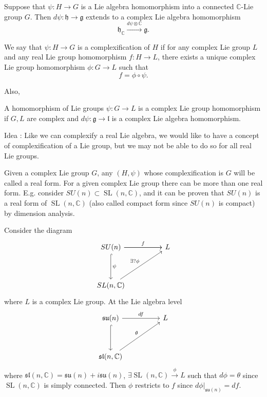 \documentclass[11pt,a4paper]{scrarticle}
\theoremstyle{definition}
\theoremstyle{greenbox}
\newcommand{\C}{\mathbb{C}}
\newcommand{\fg}{\mathfrak{g}}
\newcommand{\hg}{\mathfrak{h}}
\begin{document}
Suppose that $ \psi : H \to G $ is a Lie algebra homomorphism into a connected $ \C $-Lie group $ G $. Then $ d \psi : \hg \to \fg $ extends to a complex Lie algebra homomorphism 
\[ \hg_{\C} \xrightarrow{d \psi \otimes \C} \fg .\]

\begin{defn}
    We say that $ \psi : H \to G $ is a complexification of $ H $ if for any complex Lie group $ L $ and any real Lie group homomorphism $ f : H \to L  $, there exists a unique complex Lie group homomorphism $ \phi : G \to L$ such that 
    \[ f = \phi \circ \psi .\]
\end{defn}
Also, \begin{defn}
    A homomorphism of Lie groups $ \psi : G \to L $ is a complex Lie group homomorphism if $ G,L $ are complex and $ d \psi : \fg \to \mathfrak{l} $ is a complex Lie algebra homomorphism.
\end{defn}

Idea : Like we can complexify a real Lie algebra, we would like to have a concept of complexification of a Lie group, but we may not be able to do so for all real Lie groups.

Given a complex Lie group $ G $, any $ (H,\psi) $ whose complexification is $ G $ will be called a real form. For a given complex Lie group there can be more than one real form. E.g. consider $ SU(n) \subset \operatorname{SL}(n,\C) $, and it can be proven that $ SU(n) $ is a real form of $ \operatorname{SL}(n,\C) $ (also called compact form since $ SU(n) $ is compact) by dimension analysis. 

Consider the diagram %
\[\begin{tikzcd}
	{SU(n)} && {L} \\
	\\
	{SL(n,\mathbb{C})}
	\arrow["\psi", hook, from=1-1, to=3-1]
	\arrow["{\exists ? \phi}", from=3-1, to=1-3]
	\arrow[from=1-1, to=1-3]
    \arrow["f", from=1-1, to=1-3]
\end{tikzcd}\]
where $ L $ is a complex Lie group. At the Lie algebra level \[\begin{tikzcd}
	{\mathfrak{su}(n)} && {L} \\
	\\
	{\mathfrak{sl}(n,\mathbb{C})}
	\arrow[hook, from=1-1, to=3-1]
	\arrow["\theta", from=3-1, to=1-3]
	\arrow["df", from=1-1, to=1-3]
\end{tikzcd}\]
where $ \mathfrak{sl}(n,\C) = \mathfrak{su}(n) + i \mathfrak{su}(n) $, $ \exists  \operatorname{SL}(n,\C) \xrightarrow{\phi} L$ such that $ d \phi = \theta $ since $ \operatorname{SL}(n,\C) $ is simply connected. Then $ \phi  $ restricts to $ f $ since $ d \phi|_{ \mathfrak{su}(n)} = d f $.
\end{document}
